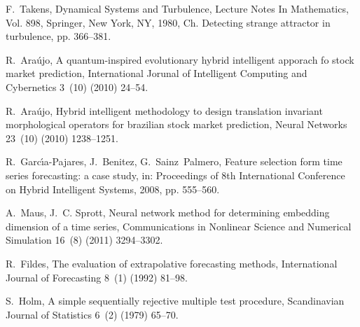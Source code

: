 \documentclass[runningheads]{llncs}
\begin{document}
\begin{thebibliography}{x}
F.~Takens, Dynamical Systems and Turbulence, Lecture Notes In Mathematics, Vol.
  898, Springer, New York, NY, 1980, Ch. Detecting strange attractor in
  turbulence, pp. 366--381.

R.~Ara\'ujo, A quantum-inspired evolutionary hybrid intelligent apporach fo
  stock market prediction, International Jorunal of Intelligent Computing and
  Cybernetics 3~(10) (2010) 24--54.

R.~Ara\'ujo, Hybrid intelligent methodology to design translation invariant
  morphological operators for brazilian stock market prediction, Neural
  Networks 23~(10) (2010) 1238--1251.

R.~Garc{\'\i}a-Pajares, J.~Benitez, G.~Sainz~Palmero, Feature selection form
  time series forecasting: a case study, in: Proceedings of 8th International
  Conference on Hybrid Intelligent Systems, 2008, pp. 555--560.

A.~Maus, J.~C. Sprott, Neural network method for determining embedding
  dimension of a time series, Communications in Nonlinear Science and Numerical
  Simulation 16~(8) (2011) 3294--3302.


R.~Fildes, The evaluation of extrapolative forecasting methods, International
  Journal of Forecasting 8~(1) (1992) 81--98.



S.~Holm, A simple sequentially rejective multiple test procedure, Scandinavian
  Journal of Statistics 6~(2) (1979) 65--70. 


\end{thebibliography}

%
\end{document}
